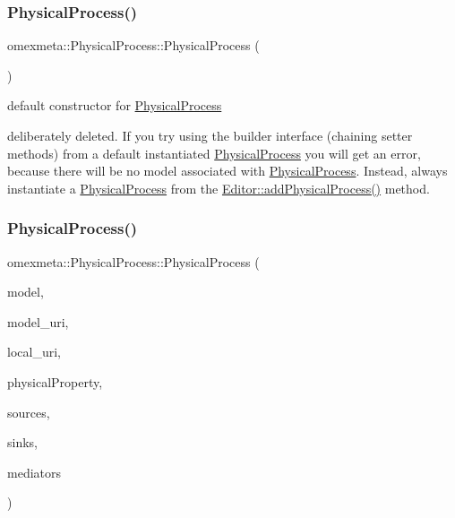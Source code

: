 \subsubsection{\texorpdfstring{Physical\+Process()}{PhysicalProcess()}\hspace{0.1cm}{\footnotesize\ttfamily [1/4]}}
{\footnotesize\ttfamily omexmeta\+::\+Physical\+Process\+::\+Physical\+Process (\begin{DoxyParamCaption}{ }\end{DoxyParamCaption})\hspace{0.3cm}{\ttfamily [delete]}}



default constructor for \hyperlink{classomexmeta_1_1PhysicalProcess}{Physical\+Process} 

deliberately deleted. If you try using the builder interface (chaining setter methods) from a default instantiated \hyperlink{classomexmeta_1_1PhysicalProcess}{Physical\+Process} you will get an error, because there will be no model associated with \hyperlink{classomexmeta_1_1PhysicalProcess}{Physical\+Process}. Instead, always instantiate a \hyperlink{classomexmeta_1_1PhysicalProcess}{Physical\+Process} from the \hyperlink{classomexmeta_1_1Editor_ae4a608ecbe64f05c1b64efbeeb1fdeb1}{Editor\+::add\+Physical\+Process()} method. \mbox{\label{classomexmeta_1_1PhysicalProcess_a37f99033da4635ff1af2b9f19c1b84ce}} 
\subsubsection{\texorpdfstring{Physical\+Process()}{PhysicalProcess()}\hspace{0.1cm}{\footnotesize\ttfamily [2/4]}}
{\footnotesize\ttfamily omexmeta\+::\+Physical\+Process\+::\+Physical\+Process (\begin{DoxyParamCaption}\item[{librdf\+\_\+model $\ast$}]{model,  }\item[{std\+::string}]{model\+\_\+uri,  }\item[{std\+::string}]{local\+\_\+uri,  }\item[{const \hyperlink{classomexmeta_1_1PhysicalProperty}{Physical\+Property} \&}]{physical\+Property,  }\item[{Sources}]{sources,  }\item[{Sinks}]{sinks,  }\item[{Mediators}]{mediators }\end{DoxyParamCaption})}



